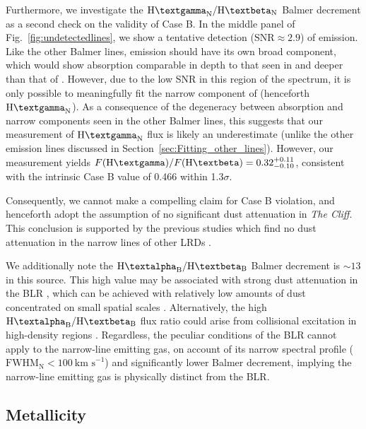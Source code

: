 \documentclass[fleqn,usenatbib]{mnras}
\newcommand{\Halpha}{\text{H\textalpha}\xspace}
\newcommand{\Hbeta}{\text{H\textbeta}\xspace}
\newcommand{\Hgamma}{\text{H\textgamma}\xspace}
\newcommand{\kms}{\ensuremath{\text{km s}^{-1}}\xspace}
\newcommand{\cliff}{\textit{The Cliff}\xspace}
\begin{document}
Furthermore, we investigate the $\Hgamma_\mathrm{N}/\Hbeta_\mathrm{N}$ Balmer decrement as a second check on the validity of Case B. 
In the middle panel of Fig.~\ref{fig:undetectedlines}, we show a tentative detection ($\mathrm{SNR} \approx 2.9$) of \Hgamma emission. Like the other Balmer lines, \Hgamma emission should have its own broad component, which would show absorption comparable in depth to that seen in \Hbeta and deeper than that of \Halpha \citep[e.g.,][]{Naidu2025, DEugenio2026}. 
However, due to the low SNR in this region of the spectrum, it is only possible to meaningfully fit the narrow component of \Hgamma (henceforth $\Hgamma_\mathrm{N}$). 
As a consequence of the degeneracy between absorption and narrow components seen in the other Balmer lines, this suggests that our measurement of $\Hgamma_\mathrm{N}$ flux is likely an underestimate (unlike the other emission lines discussed in Section~\ref{sec:Fitting_other_lines}). 
However, our measurement yields $F(\Hgamma)/F(\Hbeta) = 0.32^{+0.11}_{-0.10}$, consistent with the intrinsic Case B value of 0.466 \citep[for a typical electron temperature of $T_e \sim 10^4 \ \mathrm{K}$;][]{Osterbrock2006} within 1.3$\sigma$. 

Consequently, we cannot make a compelling claim for Case B violation, and henceforth adopt the assumption of no significant dust attenuation in \cliff. 
This conclusion is supported by the  previous studies which find no dust attenuation in the narrow lines of other LRDs \citep[e.g.][]{Lin2026, Ji2026, DEugenio2025_Irony, Nikopoulos2025}.

We additionally note the $\Halpha_\mathrm{B}/\Hbeta_\mathrm{B}$ Balmer decrement is $\sim 13$ in this source. This high value may be associated with strong dust attenuation in the BLR \citep[$A_V=4$~mag assuming Case-B recombination and the SMC attenuation curve;][]{Gordon2003}, which can be achieved with relatively low amounts of dust concentrated on small spatial scales \citep{Pacucci2026,MadauMaiolino2026}. Alternatively, the high $\Halpha_\mathrm{B}/\Hbeta_\mathrm{B}$ flux ratio could arise from collisional excitation in high-density regions \citep[see e.g.][]{Zu2025}. Regardless, the peculiar conditions of the BLR cannot apply to the narrow-line emitting gas, on account of its narrow spectral profile ($\mathrm{FWHM}_\mathrm{N} < 100 \ \kms$) and significantly lower Balmer decrement, implying the narrow-line emitting gas is physically distinct from the BLR.

\subsection{Metallicity}\label{sec:metallicity}
\end{document}
